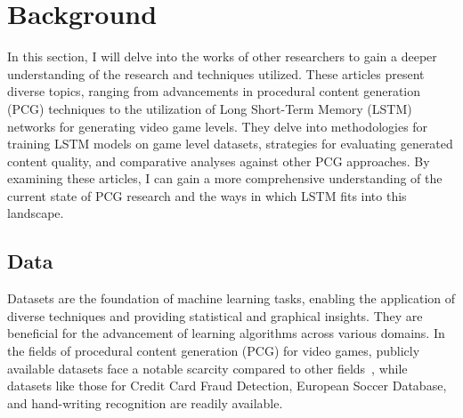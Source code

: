 \documentclass[runningheads]{llncs}
\begin{document}
\section{Background}
In this section, I will delve into the works of other researchers to gain a deeper understanding of the research and techniques utilized. These articles present diverse topics, ranging from advancements in procedural content generation (PCG) techniques to the utilization of Long Short-Term Memory (LSTM) networks for generating video game levels. They delve into methodologies for training LSTM models on game level datasets, strategies for evaluating generated content quality, and comparative analyses against other PCG approaches. By examining these articles, I can gain a more comprehensive understanding of the current state of PCG research and the ways in which LSTM fits into this landscape.



\subsection{Data}
Datasets are the foundation of machine learning tasks, enabling the application of diverse techniques and providing statistical and graphical insights. They are beneficial for the advancement of learning algorithms across various domains. In the fields of procedural content generation (PCG) for video games, publicly available datasets face a notable scarcity compared to other fields~\cite{ref_article15}, while datasets like those for Credit Card Fraud Detection, European Soccer Database, and hand-writing recognition are readily available.
\end{document}
